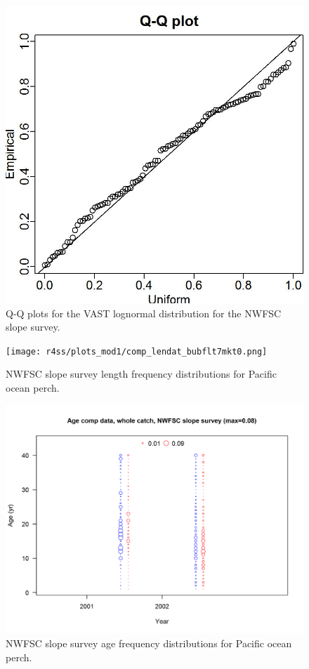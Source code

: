 \documentclass[12pt,]{article}
\begin{document}
\begin{figure}
\centering
\includegraphics{Figures/Q-Q_plot_nw_slope_gammaECE.jpg}
\caption{Q-Q plots for the VAST lognormal distribution for the NWFSC
slope survey. \label{fig:nw_slope_qq}}
\end{figure}

\FloatBarrier

\begin{figure}
\centering
\texttt{[image: r4ss/plots\_mod1/comp\_lendat\_bubflt7mkt0.png]}
\caption{NWFSC slope survey length frequency distributions for Pacific
ocean perch. \label{fig:nw_slope_Length}}
\end{figure}

\FloatBarrier

\begin{figure}
\centering
\includegraphics{r4ss/plots_mod1/comp_agedat_bubflt7mkt0.png}
\caption{NWFSC slope survey age frequency distributions for Pacific
ocean perch. \label{fig:nw_slope_Age}}
\end{figure}
\end{document}
